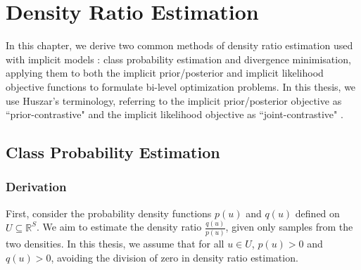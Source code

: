 \documentclass[honours,12pt]{unswthesis}
\newcommand{\R}{\mathbb{R}}
\numberwithin{equation}{section}
\theoremstyle{definition}
\begin{document}
\chapter{Density Ratio Estimation}\label{ch4}
In this chapter, we derive two common methods of density ratio estimation used with implicit models \citep{sugiyama, mohamed}: class probability estimation and divergence minimisation, applying them to both the implicit prior/posterior and implicit likelihood objective functions to formulate bi-level optimization problems. In this thesis, we use Huszar's terminology, referring to the implicit prior/posterior objective as ``prior-contrastive" and the implicit likelihood objective as ``joint-contrastive" \citep{huszar}.
\section{Class Probability Estimation}\label{sec:4.1}
\subsection{Derivation}\label{sec:4.1.1}
First, consider the probability density functions $p(u)$ and $q(u)$ defined on $U\subseteq \R^S$. We aim to estimate the density ratio $\frac{q(u)}{p(u)}$, given only samples from the two densities. In this thesis, we assume that for all $u\in U$, $p(u)>0$ and $q(u)>0$, avoiding the division of zero in density ratio estimation.
\end{document}

